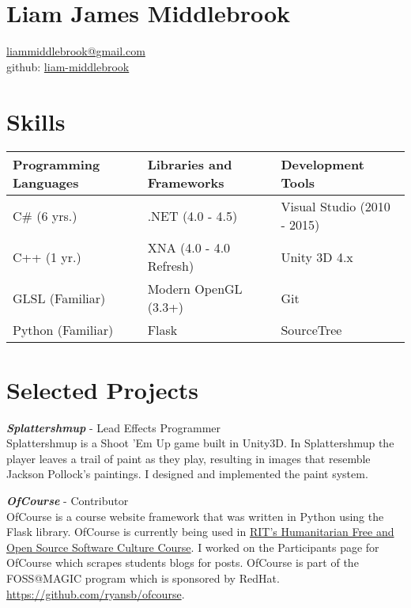 \documentclass[line,margin]{res}
\begin{document}
\marginsize{.5in}{.5in}{.5in}{.5in}

\section{Liam James Middlebrook}

\href{mailto:liammiddlebrook@gmail.com}{liammiddlebrook@gmail.com}\\
github: \href{https://github.com/liam-middlebrook}{liam-middlebrook}

\begin{resume}


\section{Skills}
\begin{table}[h]
\begin{tabular}{@{}lll@{}}
\toprule
Programming Languages & Libraries and Frameworks & Development Tools           \\ \midrule
C\# (6 yrs.)          & .NET (4.0 - 4.5)         & Visual Studio (2010 - 2015) \\
C++ (1 yr.)           & XNA (4.0 - 4.0 Refresh)  & Unity 3D 4.x                \\
GLSL (Familiar)       & Modern OpenGL (3.3+)     & Git                         \\
Python (Familiar)     & Flask                    & SourceTree                  \\ \bottomrule
\end{tabular}
\end{table}


\section{Selected Projects}

{\textbf{\emph{Splattershmup}}} - Lead Effects Programmer\\
Splattershmup is a Shoot 'Em Up game built in Unity3D. In Splattershmup the player leaves
a trail of paint as they play, resulting in images that resemble Jackson Pollock's paintings.
I designed and implemented the paint system.

{\textbf{\emph{OfCourse}}} - Contributor\\
OfCourse is a course website framework that was written in Python using the Flask library.
OfCourse is currently being used in \href{http://hfoss-fossrit.rhcloud.com}{RIT's Humanitarian
Free and Open Source Software Culture Course}. I worked on the Participants page for OfCourse
which scrapes students blogs for posts. OfCourse is part of the FOSS@MAGIC
program which is sponsored by RedHat.\\
\url{https://github.com/ryansb/ofcourse}.


\end{resume}
\end{document}
